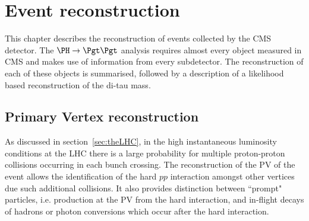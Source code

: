 \chapter{Event reconstruction}
\label{chap:reco}

This chapter describes the reconstruction of events collected by the CMS
detector. The $\PH \to \Pgt\Pgt$ analysis requires almost every object measured in
CMS and makes use of information from every subdetector. The reconstruction of
each of these objects is summarised, followed by a description of a likelihood based
reconstruction of the di-tau mass. 



\section{Primary Vertex reconstruction}
\label{sec:vertex}

As discussed in section~\ref{sec:theLHC}, in the high instantaneous luminosity
conditions at the LHC there is a large probability for multiple proton-proton
collisions occurring in each bunch crossing. 
The reconstruction of the \ac{PV} of the event allows the identification of the hard
$pp$ interaction amongst other vertices due such additional collisions. 
It also provides distinction between ``prompt" particles, i.e. production at the \ac{PV} from the hard
interaction, and in-flight decays of hadrons or photon conversions which occur
after the hard interaction.  

